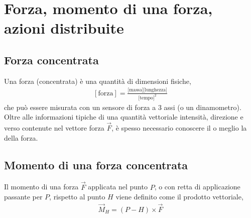 \documentclass[letterpaper,10pt,italian]{jupyterBook}
\begin{document}
\sphinxstepscope




\section{Forza, momento di una forza, azioni distribuite}
\label{\detokenize{ch/mechanics/actions-types:forza-momento-di-una-forza-azioni-distribuite}}\label{\detokenize{ch/mechanics/actions-types:physics-hs-mechanics-actions-def}}\label{\detokenize{ch/mechanics/actions-types::doc}}

\subsection{Forza concentrata}
\label{\detokenize{ch/mechanics/actions-types:forza-concentrata}}\label{\detokenize{ch/mechanics/actions-types:physics-hs-mechanics-actions-def-force}}
\sphinxAtStartPar
Una forza (concentrata) è una quantità  di dimensioni fisiche,
\begin{equation*}
\begin{split}[\text{forza}] = \frac{\text{[massa]}\text{[lunghezza]}}{\text{[tempo]}^2}\end{split}
\end{equation*}
\sphinxAtStartPar
che può essere misurata con un sensore di forza a 3 assi (o un dinamometro).
Oltre alle informazioni tipiche di una quantità vettoriale \sphinxhyphen{} intensità, direzione e verso \sphinxhyphen{} contenute nel vettore forza \(\vec{F}\), è spesso necessario conoscere il  \sphinxhyphen{} o meglio la  \sphinxhyphen{}  della forza.


\subsection{Momento di una forza concentrata}
\label{\detokenize{ch/mechanics/actions-types:momento-di-una-forza-concentrata}}\label{\detokenize{ch/mechanics/actions-types:physics-hs-mechanics-actions-def-moment}}
\sphinxAtStartPar
Il momento di una forza \(\vec{F}\) applicata nel punto \(P\), o con retta di applicazione passante per \(P\), rispetto al punto \(H\) viene definito come il prodotto vettoriale,
\begin{equation*}
\begin{split}\vec{M}_H = (P - H) \times \vec{F}\end{split}
\end{equation*}
\end{document}
